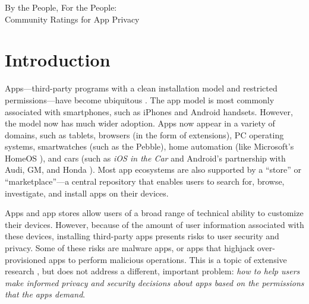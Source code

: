 \documentclass[11pt]{article}
\begin{document}
\setcounter{page}{1}
\pagestyle{empty}
\hypersetup{pageanchor=false}

\begin{center}
{\Large By the People, For the People:\\
  Community Ratings for App Privacy}
\end{center}

\smallskip

\centerline{\bf }

\bigskip

\pagestyle{plain}

\section{Introduction}

Apps---third-party programs with a clean installation model and
restricted permissions---have become ubiquitous 
\cite{gplay-50-billion, apple-50-billion}.
The app model is most commonly associated with smartphones, 
such as iPhones and Android handsets. However, the model now has much 
wider adoption. Apps now appear in a variety of domains,
such as tablets, browsers (in the form of extensions), PC operating 
systems, smartwatches (such as the Pebble), 
home automation (like Microsoft's HomeOS \cite{ms-homeos}),
and cars (such as \emph{iOS in the Car} \cite{cars-apple} and Android's 
partnership with Audi, GM, and Honda \cite{cars-google}).
Most app ecosystems are also supported by a ``store'' or
``marketplace''---a central repository that
enables users to search for, browse,
investigate, and install apps on their devices. 

Apps and app stores allow users of a broad range
of technical ability to customize their devices.
However,  
because of the amount of user information associated with these 
devices, installing third-party apps presents 
risks to user security and privacy. 
Some of these risks are malware apps, or apps that highjack
over-provisioned apps to perform malicious operations. This is a topic
of extensive research 
\cite{droidrisk-2013, android-repackaged-CODASPY12, comDroid-MOBISYS11}, 
but does not address a different,
important problem: \emph{how to help users make informed privacy and
  security decisions about apps based on the permissions that the apps
  demand}.
\end{document}
